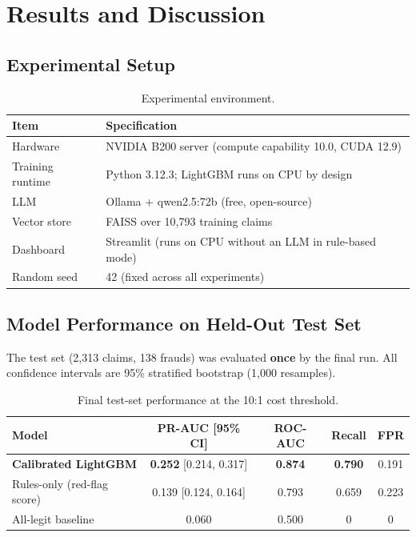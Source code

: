 \documentclass[12pt,a4paper]{article}
\begin{document}
\newpage
\section{Results and Discussion}
\label{ch:results}

\subsection{Experimental Setup}

\begin{table}[H]
\centering
\caption{Experimental environment.}
\label{tab:env}
\begin{tabular}{@{}lp{10cm}@{}}
\toprule
\textbf{Item} & \textbf{Specification} \\
\midrule
Hardware          & NVIDIA B200 server (compute capability 10.0, CUDA 12.9) \\
Training runtime  & Python 3.12.3; LightGBM runs on CPU by design \\
LLM               & Ollama + qwen2.5:72b (free, open-source) \\
Vector store      & FAISS over 10,793 training claims \\
Dashboard         & Streamlit (runs on CPU without an LLM in rule-based mode) \\
Random seed       & 42 (fixed across all experiments) \\
\bottomrule
\end{tabular}
\end{table}

\subsection{Model Performance on Held-Out Test Set}

The test set (2,313 claims, 138 frauds) was evaluated \textbf{once} by the final run.  All confidence intervals are 95\% stratified bootstrap (1,000 resamples).

\begin{table}[H]
\centering
\caption{Final test-set performance at the 10:1 cost threshold.}
\label{tab:test_results}
\begin{tabular}{@{}lcccc@{}}
\toprule
\textbf{Model} & \textbf{PR-AUC [95\% CI]} & \textbf{ROC-AUC} & \textbf{Recall} & \textbf{FPR} \\
\midrule
\textbf{Calibrated LightGBM} & \textbf{0.252} [0.214, 0.317] & \textbf{0.874} & \textbf{0.790} & 0.191 \\
Rules-only (red-flag score)   & 0.139 [0.124, 0.164]          & 0.793          & 0.659          & 0.223 \\
All-legit baseline            & 0.060                          & 0.500          & 0               & 0     \\
\bottomrule
\end{tabular}
\end{table}
\end{document}
